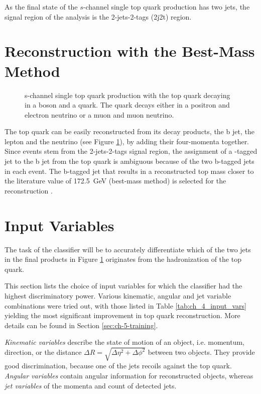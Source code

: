As the final state of the $s$-channel single top quark production has two jets, the signal region of the analysis is the 2-jets-2-tags (2j2t) region.

\section{Reconstruction with the Best-Mass Method}
\label{sec:ch-5-best-mass}
\begin{figure}[h]
    \centering
    
    \caption{s-channel single top quark production with the top quark decaying in a \PWplus boson and a \Pbottom quark. The \PWplus quark decays either in a positron and electron neutrino or a muon and muon neutrino.}
    \label{fig:ch_4_single_top_reco}
\end{figure}
The top quark can be easily reconstructed from its decay products, the b jet, the lepton and the neutrino (see Figure \ref{fig:ch_4_single_top_reco}), by adding their four-momenta together. Since events stem from the 2-jets-2-tags signal region, the assignment of a \Pbottom-tagged jet to the b jet from the top quark is ambiguous because of the two b-tagged jets in each event. The b-tagged jet that results in a reconstructed top mass closer to the literature value of \SI{172.5}{GeV} (best-mass method) is selected for the reconstruction \cite{Fal18}.

\section{Input Variables}
\label{sec:ch-5-input-vars}
The task of the classifier will be to accurately differentiate which of the two \Pbottom jets in the final products in Figure \ref{fig:ch_4_single_top_reco} originates from the hadronization of the top quark.

This section lists the choice of input variables for which the classifier had the highest discriminatory power. Various kinematic, angular and jet variable combinations were tried out, with those listed in Table \ref{tab:ch_4_input_vars} yielding the most significant improvement in top quark reconstruction. More details can be found in Section \ref{sec:ch-5-training}.

\emph{Kinematic variables} describe the state of motion of an object, i.e. momentum, direction, or the distance $\Delta R=\sqrt{\Delta \eta^2 + \Delta \phi^2}$ between two objects. They provide good discrimination, because one of the jets recoils against the top quark. \emph{Angular variables} contain angular information for reconstructed objects, whereas \emph{jet variables} of the momenta and count of detected jets.

